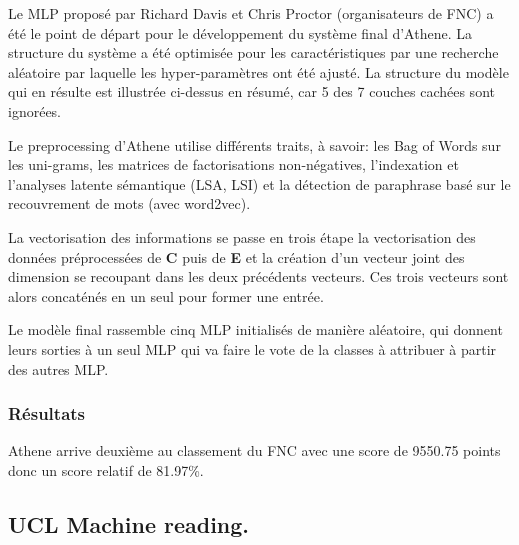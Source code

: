 \documentclass[onecolumn, 12pt]{article}
\begin{document}
Le MLP proposé par Richard Davis et Chris Proctor (organisateurs de FNC) a été le point de départ pour le développement du
système final d'Athene.
La structure du système a été optimisée pour les
caractéristiques par une recherche aléatoire par laquelle les hyper-paramètres ont
été ajusté.
La structure du modèle qui en résulte est illustrée ci-dessus en résumé, car 5 des 7 couches cachées sont ignorées.

Le preprocessing d'Athene utilise différents traits, à savoir: les Bag of Words sur les uni-grams, les matrices de factorisations non-négatives, l'indexation et l'analyses latente sémantique (LSA, LSI) et la détection de paraphrase basé sur le recouvrement de mots (avec word2vec).

La vectorisation des informations se passe en trois étape la vectorisation des données préprocessées de \textbf{C} puis de \textbf{E} et la création d'un vecteur joint des dimension se recoupant dans les deux précédents vecteurs.
Ces trois vecteurs sont alors concaténés en un seul pour former une entrée.

Le modèle final rassemble cinq MLP initialisés de manière aléatoire, qui donnent leurs sorties à un seul MLP qui va faire le vote de la classes à attribuer à partir des autres MLP.
\subsubsection{Résultats}
Athene arrive deuxième au classement du FNC avec une score de 9550.75 points donc un score relatif de 81.97\%.


\subsection{UCL Machine reading.}
\end{document}
